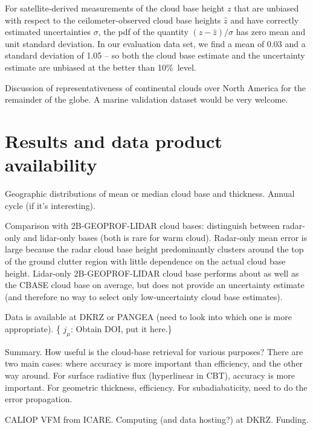 \documentclass[amt,manuscript]{copernicus}\usepackage[]{graphicx}\usepackage[]{color}
\newcommand{\hlnum}[1]{\textcolor[rgb]{0.686,0.059,0.569}{#1}}%
\newcommand\comment[2]{\{\hlnum{ \textit{#1}: #2}\}}
\newcommand\commentjm[1]{\comment{$j_\mu$}{#1}}
\begin{document}
For satellite-derived measurements of the cloud base height $z$ that are
unbiased with respect to the ceilometer-observed cloud base heights $\hat{z}$
and have correctly estimated uncertainties $\sigma$, the pdf of the quantity
$(z - \hat{z})/\sigma$ has zero mean and unit standard deviation. In our
evaluation data set, we find a mean of 0.03 and a standard deviation of 1.05 -- so both the cloud base estimate and
the uncertainty estimate are unbiased at the better than 10\%\ level.

Discussion of representativeness of continental clouds over North America for
the remainder of the globe.  A marine validation dataset would be very welcome. 

\section{Results and data product availability}
\label{sec:results}

Geographic distributions of mean or median cloud base and thickness.  Annual
cycle (if it's interesting).  

Comparison with 2B-GEOPROF-LIDAR cloud bases: distinguish between radar-only and
lidar-only bases (both is rare for warm cloud).  Radar-only mean error is large
because the radar cloud base height predominantly clusters around the top of the
ground clutter region with little dependence on the actual cloud base height.
Lidar-only 2B-GEOPROF-LIDAR cloud base performs about as well as the CBASE cloud
base on average, but does not provide an uncertainty estimate (and therefore no
way to select only low-uncertainty cloud base estimates).

Data is available at DKRZ or PANGEA (need to look into which one is more
appropriate).  \commentjm{Obtain DOI, put it here.}

\conclusions
\label{sec:conclusions}
\par Summary.  How useful is the cloud-base retrieval for various purposes?
There are two main cases: where accuracy is more important than efficiency, and
the other way around.  For surface radiative flux (hyperlinear in CBT), accuracy
is more important.  For geometric thickness, efficiency.  For subadiabaticity,
need to do the error propagation.

\begin{acknowledgements}
CALIOP VFM from ICARE.  Computing (and data hosting?) at DKRZ.  Funding.
\end{acknowledgements}
\end{document}
